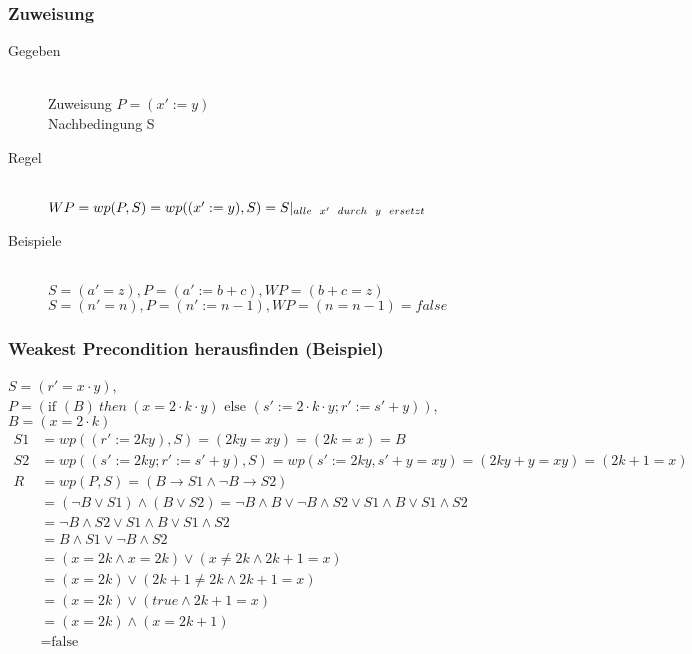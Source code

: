 \documentclass[a4paper,10pt]{article}
\newcommand{\T}[1]{\text{#1}} %
\begin{document}
\subsubsection{Zuweisung}
\begin{description}
	\item[Gegeben] \hfill \\
		Zuweisung $P = (x' := y)$ \\
		Nachbedingung S
	\item[Regel] \hfill \\
		$WP = wp(P, S) = wp((x' := y), S) = S |_{alle \hspace{2mm} x' \hspace{2mm} durch \hspace{2mm} y \hspace{2mm} ersetzt}$
	\item[Beispiele] \hfill \\
		$S = (a' = z), P = (a' := b + c), WP = (b + c = z)$ \\
		$S = (n' = n), P = (n' := n-1), WP = (n = n-1) = false$
\end{description}
\subsubsection{Weakest Precondition herausfinden (Beispiel)}
$S=(r'=x\cdot y)$, $P=(\T{if } ( B ) ~then~ ( x=2\cdot k\cdot y ) \T{ else }( s':=2\cdot k\cdot y;r':=s'+y ))$, $B=(x=2\cdot k)$
\begin{align*}
S1&=wp((r':=2ky),S)=(2ky=xy)=(2k=x)=B\\
S2&=wp((s':=2ky;r':=s'+y),S)=wp(s':=2ky,s'+y=xy)=(2ky+y=xy)=(2k+1=x)\\
R&=wp(P,S)=(B\to S1\wedge\neg B\to S2)\\
&=(\neg B\vee S1)\wedge(B \vee S2)=\neg B\wedge B\vee\neg B\wedge S2\vee S1\wedge B \vee S1\wedge S2\\
&=\neg B\wedge S2\vee S1\wedge B \vee S1\wedge S2\\
&=B\wedge S1\vee\neg B\wedge S2\\
&=(x=2k\wedge x=2k)\vee(x\neq 2k\wedge 2k+1=x)\\
&=(x=2k)\vee(2k+1\neq 2k\wedge 2k+1=x)\\
&=(x=2k)\vee(true\wedge 2k+1=x)\\
&=(x=2k)\wedge(x=2k+1)\\
&= \T{false}
\end{align*}
\end{document}
